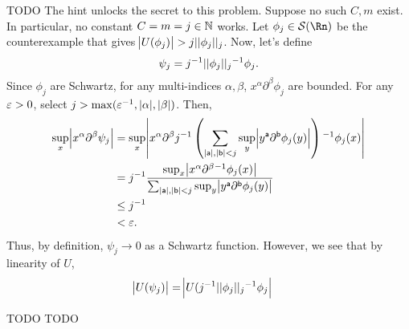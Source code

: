 \documentclass{article}
\renewcommand{\d}{\partial}
\begin{document}
\newpage
{} TODO
 \tri
\hop 
\solution
The hint unlocks the secret to this problem. Suppose no such $C, m$ exist. In particular, no constant $C = m = j \in \mathbb{N}$ works. Let $\phi_j \in \cal{S}(\Rn)$ be the counterexample that gives $\abs{U(\phi_j)} > j||\phi_j||_j$. Now, let's define 
\[\psi_j = j{^{-1}}||\phi_j||_j{^{-1}}\phi_j.\]
Since $\phi_j$ are Schwartz, for any multi-indices $\alpha, \beta$,  $x^\alpha \d^\beta \phi_j$ are bounded. For any $\varepsilon > 0$, select $j > \max(\varepsilon {^{-1}}, |\alpha| , |\beta|)$. Then, 
\begin{align*}
    \sup_x\abs{x^\alpha \d^\beta \psi_j} &= \sup_x \abs{x^\alpha \d^\beta j\inv \del{\sum_{|{\sf{a}}|, |{\sf{b}}| < j} \sup_{y} \abs{y^{\sf a} \d^{\sf b} \phi_j(y)}}\inv \phi_j(x)}\\
    &= j\inv \frac{ \sup_x \abs{x^\alpha \d^\beta \inv \phi_j(x)}}{\sum_{|{\sf{a}}|, |{\sf{b}}| < j} \sup_{y} \abs{y^{\sf a} \d^{\sf b} \phi_j(y)}} \\
    &\le j\inv \\
    &< \eps.
\end{align*}
Thus, by definition, $\psi_j \to 0$ as a Schwartz function. 
\hop 
However, we see that by linearity of $U$, 
\begin{align*}
    \abs{U(\psi_j)} &= \abs{U(j{^{-1}}||\phi_j||_j{^{-1}}\phi_j}
\end{align*}


\newpage
{} TODO
 \tri
\hop 
\solution
TODO 
\end{document}
